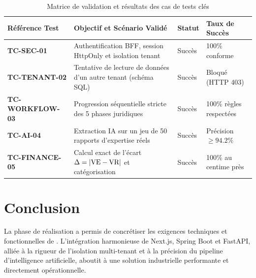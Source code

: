 \begin{table}[H]
\centering
\small
\caption{Matrice de validation et résultats des cas de tests clés}
\label{tab:resultats_tests}
\begin{tabularx}{\textwidth}{@{}L{3.2cm} Y L{1.5cm} L{2.6cm}@{}}
\toprule
\textbf{Référence Test} & \textbf{Objectif et Scénario Validé} & \textbf{Statut} & \textbf{Taux de Succès} \\
\midrule
\textbf{TC-SEC-01} & Authentification BFF, session HttpOnly et isolation tenant & Succès & 100\% conforme \\
\addlinespace
\textbf{TC-TENANT-02} & Tentative de lecture de données d'un autre tenant (schéma SQL) & Succès & Bloqué (HTTP 403) \\
\addlinespace
\textbf{TC-WORKFLOW-03} & Progression séquentielle stricte des 5 phases juridiques & Succès & 100\% règles respectées \\
\addlinespace
\textbf{TC-AI-04} & Extraction IA sur un jeu de 50 rapports d'expertise réels & Succès & Précision $\ge 94.2\%$ \\
\addlinespace
\textbf{TC-FINANCE-05} & Calcul exact de l'écart $\Delta = |\text{VE} - \text{VR}|$ et catégorisation & Succès & 100\% au centime près \\
\bottomrule
\end{tabularx}
\end{table}

\section{Conclusion}

La phase de réalisation a permis de concrétiser les exigences techniques et fonctionnelles de \projectShortTitle. L'intégration harmonieuse de Next.js, Spring Boot et FastAPI, alliée à la rigueur de l'isolation multi-tenant et à la précision du pipeline d'intelligence artificielle, aboutit à une solution industrielle performante et directement opérationnelle.
